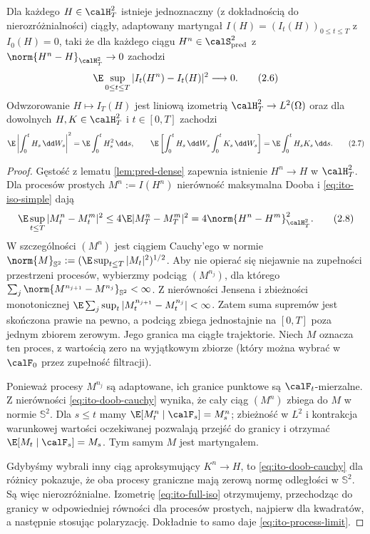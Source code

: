 \begin{twierdzenie}\label{th:ito-extension}
Dla każdego $H\in\calH_T^2$ istnieje jednoznaczny
(z dokładnością do nierozróżnialności) ciągły,
adaptowany martyngał $I(H)=(I_t(H))_{0\le t\le T}$
z $I_0(H)=0$, taki że dla każdego ciągu
$H^n\in\calS_{\mathrm{pred}}^2$ z
$\norm{H^n-H}_{\calH_T^2}\to0$ zachodzi
\[
\E\sup_{0\le t\le T}|I_t(H^n)-I_t(H)|^2\longrightarrow0.
\tag{2.6}\label{eq:ito-process-limit}
\]
Odwzorowanie $H\mapsto I_T(H)$ jest liniową izometrią
$\calH_T^2\to L^2(\Omega)$ oraz dla dowolnych
$H,K\in\calH_T^2$ i $t\in[0,T]$ zachodzi
\[
\E\left|\int_0^tH_s\,\dd W_s\right|^2
=\E\int_0^tH_s^2\,\dd s,
\qquad
\E\left[\int_0^tH_s\,\dd W_s\int_0^tK_s\,\dd W_s\right]
=\E\int_0^tH_sK_s\,\dd s.
\tag{2.7}\label{eq:ito-full-iso}
\]
\end{twierdzenie}
\begin{proof}
Gęstość z lematu \ref{lem:pred-dense} zapewnia istnienie
$H^n\to H$ w $\calH_T^2$. Dla procesów prostych
$M^n:=I(H^n)$ nierówność maksymalna Dooba i
\eqref{eq:ito-iso-simple} dają
\[
\E\sup_{t\le T}|M_t^n-M_t^m|^2
\le4\E|M_T^n-M_T^m|^2
=4\norm{H^n-H^m}_{\calH_T^2}^2.
\tag{2.8}\label{eq:ito-doob-cauchy}
\]
W szczególności $(M^n)$ jest ciągiem Cauchy'ego
w normie $\norm{M}_{\mathbb S^2}:=(\E\sup_{t\le T}|M_t|^2)^{1/2}$.
Aby nie opierać się niejawnie na zupełności przestrzeni
procesów, wybierzmy podciąg $(M^{n_j})$, dla którego
$\sum_j\norm{M^{n_{j+1}}-M^{n_j}}_{\mathbb S^2}<\infty$.
Z nierówności Jensena i zbieżności monotonicznej
$\E\sum_j\sup_t|M_t^{n_{j+1}}-M_t^{n_j}|<\infty$.
Zatem suma supremów jest skończona prawie na pewno,
a podciąg zbiega jednostajnie na $[0,T]$ poza jednym
zbiorem zerowym. Jego granica ma ciągłe trajektorie.
Niech $M$ oznacza ten proces, z wartością zero na
wyjątkowym zbiorze (który można wybrać w $\calF_0$
przez zupełność filtracji).

Ponieważ procesy $M^{n_j}$ są adaptowane, ich granice
punktowe są $\calF_t$-mierzalne. Z nierówności
\eqref{eq:ito-doob-cauchy} wynika, że cały ciąg
$(M^n)$ zbiega do $M$ w normie $\mathbb S^2$.
Dla $s\le t$ mamy
$\E[M_t^n\mid\calF_s]=M_s^n$; zbieżność w $L^2$
i kontrakcja warunkowej wartości oczekiwanej pozwalają
przejść do granicy i otrzymać $\E[M_t\mid\calF_s]=M_s$.
Tym samym $M$ jest martyngałem.

Gdybyśmy wybrali inny ciąg aproksymujący $K^n\to H$,
to \eqref{eq:ito-doob-cauchy} dla różnicy pokazuje,
że oba procesy graniczne mają zerową normę odległości
w $\mathbb S^2$. Są więc nierozróżnialne.
Izometrię \eqref{eq:ito-full-iso} otrzymujemy,
przechodząc do granicy w odpowiedniej równości dla
procesów prostych, najpierw dla kwadratów, a następnie
stosując polaryzację. Dokładnie to samo daje
\eqref{eq:ito-process-limit}.
\end{proof}

